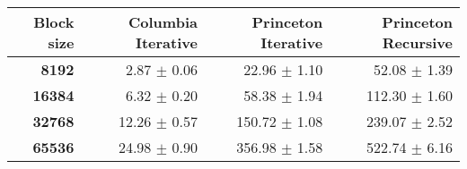 \begin{tabular}{rrrr}\toprule
\textbf{Block size}  & \textbf{Columbia Iterative} & \textbf{Princeton Iterative} & \textbf{Princeton Recursive}\\\midrule
\textbf{8192}  & 2.87 $\pm$ 0.06 & 22.96 $\pm$ 1.10 & 52.08 $\pm$ 1.39\\
\textbf{16384}  & 6.32 $\pm$ 0.20 & 58.38 $\pm$ 1.94 & 112.30 $\pm$ 1.60\\
\textbf{32768}  & 12.26 $\pm$ 0.57 & 150.72 $\pm$ 1.08 & 239.07 $\pm$ 2.52\\
\textbf{65536} & 24.98 $\pm$ 0.90 & 356.98 $\pm$ 1.58 & 522.74 $\pm$ 6.16\\
\bottomrule
\end{tabular}
